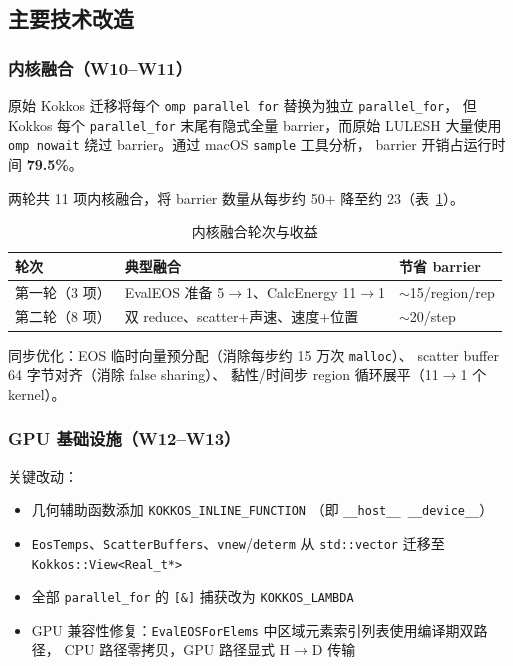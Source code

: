 \documentclass[UTF8,12pt,a4paper]{ctexart}
\begin{document}
\subsection{主要技术改造}

\subsubsection{内核融合（W10--W11）}

原始 Kokkos 迁移将每个 \texttt{omp parallel for} 替换为独立 \texttt{parallel\_for}，
但 Kokkos 每个 \texttt{parallel\_for} 末尾有隐式全量 barrier，而原始 LULESH 大量使用
\texttt{omp nowait} 绕过 barrier。通过 macOS \texttt{sample} 工具分析，
barrier 开销占运行时间 \textbf{79.5\%}。

两轮共 11 项内核融合，将 barrier 数量从每步约 50+ 降至约 23（表~\ref{tab:fusion}）。

\begin{table}[H]
\centering
\caption{内核融合轮次与收益}
\label{tab:fusion}
\begin{tabular}{lll}
\toprule
\textbf{轮次} & \textbf{典型融合} & \textbf{节省 barrier} \\
\midrule
第一轮（3 项） & EvalEOS 准备 5$\to$1、CalcEnergy 11$\to$1 & $\sim$15/region/rep \\
第二轮（8 项） & 双 reduce、scatter+声速、速度+位置 & $\sim$20/step \\
\bottomrule
\end{tabular}
\end{table}

同步优化：EOS 临时向量预分配（消除每步约 15 万次 \texttt{malloc}）、
scatter buffer 64 字节对齐（消除 false sharing）、
黏性/时间步 region 循环展平（11$\to$1 个 kernel）。

\subsubsection{GPU 基础设施（W12--W13）}

关键改动：
\begin{itemize}[noitemsep,topsep=2pt]
  \item 几何辅助函数添加 \texttt{KOKKOS\_INLINE\_FUNCTION}
        （即 \texttt{\_\_host\_\_ \_\_device\_\_}）
  \item \texttt{EosTemps}、\texttt{ScatterBuffers}、\texttt{vnew}/\texttt{determ}
        从 \texttt{std::vector} 迁移至 \texttt{Kokkos::View<Real\_t*>}
  \item 全部 \texttt{parallel\_for} 的 \texttt{[\&]} 捕获改为 \texttt{KOKKOS\_LAMBDA}
  \item GPU 兼容性修复：\texttt{EvalEOSForElems} 中区域元素索引列表使用编译期双路径，
        CPU 路径零拷贝，GPU 路径显式 H$\to$D 传输
\end{itemize}
\end{document}
